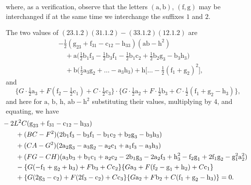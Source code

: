 \documentclass[11pt,a4paper]{article}
\begin{document}
\thispagestyle{plain}
\noindent where, as a verification, observe that the letters $(\text{a}, \text{b})$, $(\text{f}, \text{g})$ may be interchanged if at the same time we interchange the suffixes $1$ and $2$.

\medskip
The two values of $(23.1.2)(31.1.2) - (33.1.2)(12.1.2)$ are
\begin{align*}
&-\tfrac{1}{2}(\text{g}_{23} + \text{f}_{31} - \text{c}_{12} - \text{h}_{33})(\text{a}\text{b} - \text{h}^{2})\\
&\quad + \text{a}\big(\tfrac{1}{2}\text{b}_{1}\text{f}_{3} - \tfrac{1}{2}\text{b}_{3}\text{f}_{1} - \tfrac{1}{2}\text{b}_{1}\text{c}_{2} + \tfrac{1}{2}\text{b}_{2}\text{g}_{3} - \text{b}_{3}\text{h}_{3}\big)\\
&\quad + \text{b}\big(\tfrac{1}{2}\text{a}_{3}\text{g}_{2} + \ldots - \text{a}_{3}\text{h}_{3}\big) + \text{h}\big[\ldots - \tfrac{1}{2}(\text{f}_{1} + \text{g}_{2})^{2}\big],
\end{align*}
and
\[
\{G\cdot \tfrac{1}{2}\text{a}_{3} + F(\text{f}_{2} - \tfrac{1}{2}\text{c}_{1}) + C\cdot \tfrac{1}{2}\text{c}_{3}\}\cdot\{G\cdot \tfrac{1}{2}\text{a}_{2} + F\cdot \tfrac{1}{2}\text{b}_{3} + C\cdot\tfrac{1}{2}(\text{f}_{1} + \text{g}_{2} - \text{h}_{3})\},
\]
and here for $\text{a}$, $\text{b}$, $\text{h}$, $\text{ab} - \text{h}^{2}$ substituting their values, multiplying by 4, and equating, we have
\begin{align*}
&\hspace*{-1em} -2L^{2}C(\text{g}_{23} + \text{f}_{31} - \text{c}_{12} - \text{h}_{33})\\
&\quad + (BC - F^{2})(2\text{b}_{1}\text{f}_{3} - \text{b}_{3}\text{f}_{1} - \text{b}_{1}\text{c}_{2} + \text{b}_{2}\text{g}_{3} - \text{b}_{3}\text{h}_{3})\\
&\quad + (CA - G^{2})(2\text{a}_{2}\text{g}_{3} - \text{a}_{3}\text{g}_{2} - \text{a}_{2}\text{c}_{1} + \text{a}_{1}\text{f}_{3} - \text{a}_{3}\text{h}_{3})\\
&\quad + (FG - CH)(\text{a}_{3}\text{b}_{3} + \text{b}_{1}\text{c}_{1} + \text{a}_{2}\text{c}_{2} - 2\text{b}_{1}\text{g}_{3} - 2\text{a}_{2}\text{f}_{3} + \text{h}_{3}^{2} - \text{f}_{2}\text{g}_{1} + 2\text{f}_{1}\text{g}_{2} - \text{g}_{1}^{2}\text{a}_{2}^{2})\\
&\quad - \{G(-\text{f}_{1} + \text{g}_{2} + \text{h}_{3}) + F\text{b}_{3} + C\text{c}_{2}\}\{G\text{a}_{3} + F(\text{f}_{2} - \text{g}_{1} + \text{h}_{2}) + C\text{c}_{1}\}\\
&\quad + \{G(2\text{g}_{3} - \text{c}_{2}) + F(2\text{f}_{3} - \text{c}_{2}) + C\text{c}_{3}\}\{G\text{a}_{2} + F\text{b}_{2} + C(\text{f}_{1} + \text{g}_{2} - \text{h}_{3})\} = 0.
\end{align*}
\end{document}
